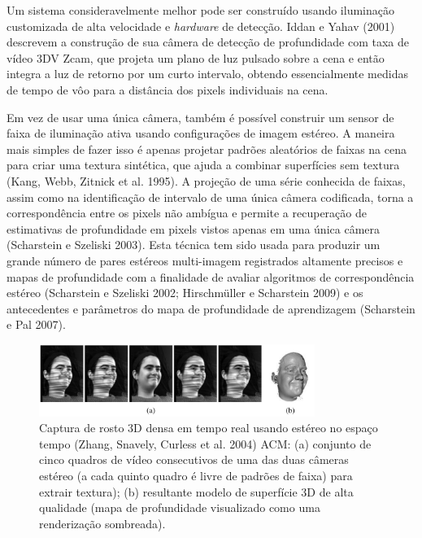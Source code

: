 \documentclass{article}
\begin{document}
Um sistema consideravelmente melhor pode ser construído usando iluminação customizada de alta velocidade e \textit{hardware} de detecção. Iddan e Yahav (2001) descrevem a construção de sua câmera de detecção de profundidade com taxa de vídeo 3DV Zcam, que projeta um plano de luz pulsado sobre a cena e então integra a luz de retorno por um curto intervalo, obtendo essencialmente medidas de tempo de vôo para a distância dos pixels individuais na cena.

Em vez de usar uma única câmera, também é possível construir um sensor de faixa de iluminação ativa usando configurações de imagem estéreo. A maneira mais simples de fazer isso é apenas projetar padrões aleatórios de faixas na cena para criar uma textura sintética, que ajuda a combinar superfícies sem textura (Kang, Webb, Zitnick et al. 1995). A projeção de uma série conhecida de faixas, assim como na identificação de intervalo de uma única câmera codificada, torna a correspondência entre os pixels não ambígua e permite a recuperação de estimativas de profundidade em pixels vistos apenas em uma única câmera (Scharstein e Szeliski 2003). Esta técnica tem sido usada para produzir um grande número de pares estéreos multi-imagem registrados altamente precisos e mapas de profundidade com a finalidade de avaliar algoritmos de correspondência estéreo (Scharstein e Szeliski 2002; Hirschmüller e Scharstein 2009) e os antecedentes e parâmetros do mapa de profundidade de aprendizagem (Scharstein e Pal 2007).

\begin{figure}[!htb]
    \centering
    \includegraphics[width=0.8\textwidth]{mapaProfundidade.png}
    \caption{Captura de rosto 3D densa em tempo real usando estéreo no espaço tempo (Zhang, Snavely, Curless et al. 2004) ACM: (a) conjunto de cinco quadros de vídeo consecutivos de uma das duas câmeras estéreo (a cada quinto quadro é livre de padrões de faixa) para extrair textura); (b) resultante modelo de superfície 3D de alta qualidade (mapa de profundidade visualizado como uma renderização sombreada).}
    \label{fig:mapaProfundidade}
\end{figure}
\end{document}
